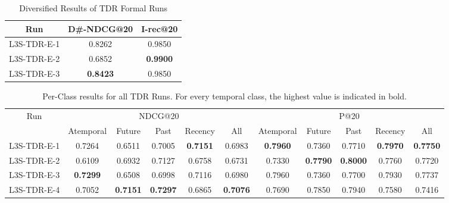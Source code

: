 \documentclass{sig-alternate}
\begin{document}
\begin{table}[htb]
\centering
\begin{tabular}{|c|c|c|}
\hline
Run & D\#-NDCG@20 & I-rec@20 \\
\hline
\hline
L3S-TDR-E-1 & 0.8262 & 0.9850 \\
\hline
L3S-TDR-E-2 & 0.6852 & \textbf{0.9900} \\
\hline
L3S-TDR-E-3 & \textbf{0.8423} & 0.9850 \\
\hline
\end{tabular}  
\caption{Diversified Results of TDR Formal Runs}
\label{table:3}
\end{table}
\begin{table*}[htb]
\begin{tabular}{ |c|c|c|c|c|c|c|c|c|c|c| }
 \hline
  \multirow{2}{*}{Run} & \multicolumn{5}{|c|}{NDCG@20} & \multicolumn{5}{|c|}{P@20}\\
  	\hhline{~----------}
    & Atemporal & Future & Past & Recency & All & Atemporal & Future & Past & Recency & All \\
    \hline
 \hline
 L3S-TDR-E-1 & 0.7264 & 0.6511 & 0.7005 & \textbf{0.7151} & 0.6983 & \textbf{0.7960} & 0.7360 & 0.7710 & \textbf{0.7970} & \textbf{0.7750}\\ 
 \hline
 L3S-TDR-E-2 & 0.6109 & 0.6932 & 0.7127 & 0.6758 & 0.6731 & 0.7330 & \textbf{0.7790} & \textbf{0.8000} & 0.7760 & 0.7720\\ 
 \hline
 L3S-TDR-E-3 & \textbf{0.7299} & 0.6508 & 0.6998 & 0.7116 & 0.6980 & 0.7960 & 0.7360 & 0.7700 & 0.7930 & 0.7737\\ 
 \hline
 L3S-TDR-E-4 & 0.7052 & \textbf{0.7151} & \textbf{0.7297} & 0.6865 & \textbf{0.7076} & 0.7690 & 0.7850 & 0.7940 & 0.7580 & 0.7416\\ 
 \hline
\end{tabular}
\caption{Per-Class results for all TDR Runs. For every temporal class, the highest value is indicated in bold.}
\label{table:2}
\end{table*}
\end{document}
